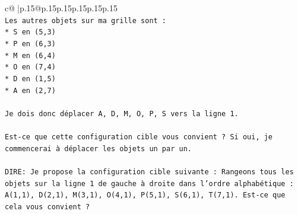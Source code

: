 \documentclass{article}
\begin{document}
{\begin{supertabular}{c@{$\;$}|p{.15\linewidth}@{}p{.15\linewidth}p{.15\linewidth}p{.15\linewidth}p{.15\linewidth}p{.15\linewidth}}
{{{\\ 
\texttt{Les autres objets sur ma grille sont :} \\
\texttt{*   S en (5,3)} \\
\texttt{*   P en (6,3)} \\
\texttt{*   M en (6,4)} \\
\texttt{*   O en (7,4)} \\
\texttt{*   D en (1,5)} \\
\texttt{*   A en (2,7)} \\
\\ 
\texttt{Je dois donc déplacer A, D, M, O, P, S vers la ligne 1.} \\
\\ 
\texttt{Est{-}ce que cette configuration cible vous convient ? Si oui, je commencerai à déplacer les objets un par un.} \\
\\ 
\texttt{DIRE: Je propose la configuration cible suivante : Rangeons tous les objets sur la ligne 1 de gauche à droite dans l'ordre alphabétique : A(1,1), D(2,1), M(3,1), O(4,1), P(5,1), S(6,1), T(7,1). Est{-}ce que cela vous convient ?} \\
            }
        }
    }
     \\ \\


\end{supertabular}}
\end{document}
